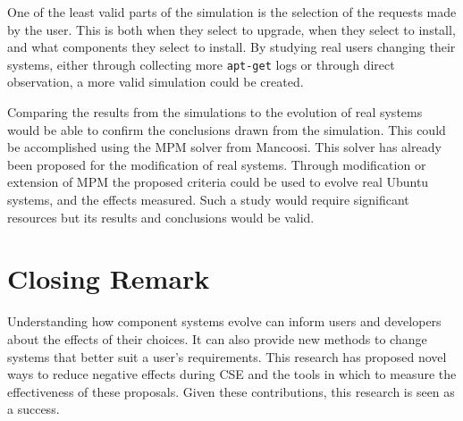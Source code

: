 One of the least valid parts of the simulation is the selection of the requests made by the user.
This is both when they select to upgrade, when they select to install, and what components they select to install.
By studying real users changing their systems, either through collecting more \texttt{apt-get} logs or through direct observation,
a more valid simulation could be created.

Comparing the results from the simulations to the evolution of real systems would be able to confirm the conclusions drawn from the simulation.
This could be accomplished using the MPM solver \citep{abate2011} from Mancoosi.
This solver has already been proposed for the modification of real systems.
Through modification or extension of MPM the proposed criteria could be used to evolve real Ubuntu systems, and the effects measured.
Such a study would require significant resources but its results and conclusions would be valid.

\section{Closing Remark}
Understanding how component systems evolve can inform users and developers about the effects of their choices.
It can also provide new methods to change systems that better suit a user's requirements.
This research has proposed novel ways to reduce negative effects during CSE and the tools in which to measure the effectiveness of these proposals.
Given these contributions, this research is seen as a success.
 

